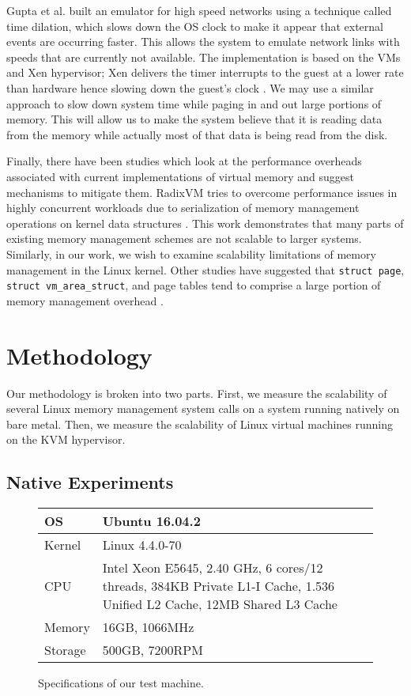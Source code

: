 \documentclass[twocolumn,11pt]{article}
\begin{document}
Gupta et al. built an emulator for high speed networks using a technique called
time dilation, which slows down the OS clock to make it appear that external
events are occurring faster. This allows the system to emulate network links
with speeds that are currently not available. The implementation is based on the
VMs and Xen hypervisor; Xen delivers the timer interrupts to the guest at a
lower rate than hardware hence  slowing down the guest’s clock \cite{timedil}.
We may use a similar approach to slow down system time  while paging in and out
large portions of memory. This will allow us to make the system believe that it
is reading data from the memory while actually most of that data is being read
from the disk.

Finally, there have been studies which look at the performance overheads
associated with current implementations of virtual memory and suggest mechanisms
to mitigate them. RadixVM tries to overcome performance issues in highly
concurrent workloads due to serialization of memory management operations on
kernel data structures \cite{radixvm}. This work demonstrates that many parts of
existing memory management schemes are not scalable to larger systems.
Similarly, in our work, we wish to examine scalability limitations of memory
management in the Linux kernel. Other studies have suggested that \texttt{struct
page}, \texttt{struct vm\_area\_struct}, and page tables tend to comprise a
large portion of memory management overhead \cite{simics}.

\section{Methodology}

Our methodology is broken into two parts. First, we measure the scalability of
several Linux memory management system calls on a system running natively on
bare metal. Then, we measure the scalability of Linux virtual machines running
on the KVM hypervisor.

\subsection{Native Experiments}

\begin{figure}
\centering
\begin{tabular}{|l|p{5cm}|} \hline
OS & Ubuntu 16.04.2 \\ \hline
Kernel & Linux 4.4.0-70 \\ \hline
CPU & Intel Xeon E5645, 2.40 GHz, 6 cores/12 threads, 384KB Private L1-I Cache,
1.536 Unified L2 Cache, 12MB Shared L3 Cache \\ \hline
Memory & 16GB, 1066MHz \\ \hline
Storage & 500GB, 7200RPM \\
\hline
\end{tabular}
\caption{Specifications of our test machine.  \label{fig:specs}}
\end{figure}
\end{document}
